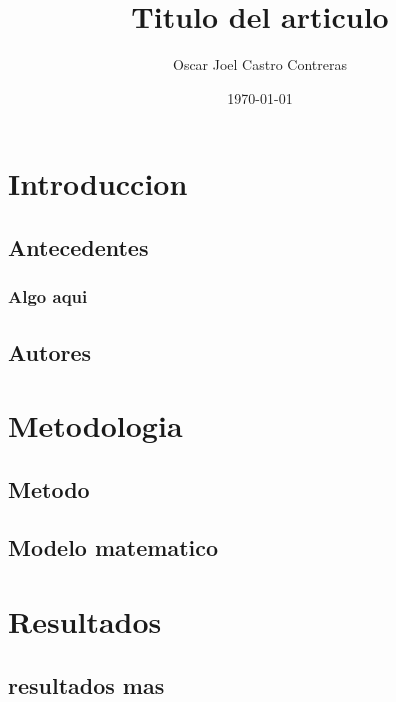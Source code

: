 \documentclass[12pt, letter]{article} %
\title{Titulo del articulo}
\author{Oscar Joel Castro Contreras}
\date{\today}
\begin{document}
\maketitle %

\newpage %

\tableofcontents %

\section{Introduccion}
\subsection{Antecedentes}
\subsubsection{Algo aqui}
\subsection{Autores}

\section{Metodologia}
\subsection{Metodo}
\subsection{Modelo matematico}

\section{Resultados}
\subsection{resultados mas}
\end{document}
